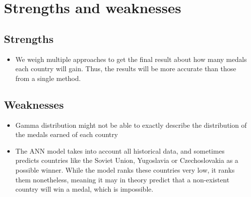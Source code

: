 \documentclass{mcmthesis}
\begin{document}
\section{Strengths and weaknesses}


\subsection{Strengths}
\begin{itemize}
\item{We weigh multiple approaches to get the final result about how many medals each country will gain. Thus, the results will be more accurate than those from a single method.}
\end{itemize}

\subsection{Weaknesses}

\begin{itemize}
\item {Gamma distribution might not be able to exactly describe the distribution of the medals earned of each country}
\item {The ANN model takes into account all historical data, and sometimes predicts countries like the Soviet Union, Yugoslavia or Czechoslovakia as a possible winner. While the model ranks these countries very low, it ranks them nonetheless, meaning it may in theory predict that a non-existent country will win a medal, which is impossible.}

\end{itemize}

\printbibliography
\end{document}
